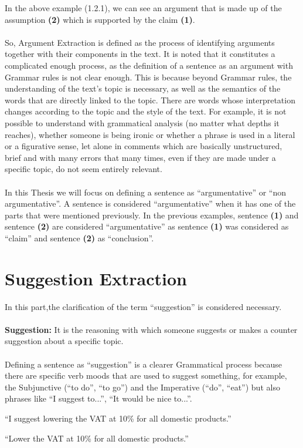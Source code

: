 In the above example (1.2.1), we can see an argument that is made up of the assumption \textbf{(2)} which is supported by the claim \textbf{(1)}.\\
\\
So, Argument Extraction is defined as the process of identifying arguments together with their components in the text. It is noted that it constitutes a complicated enough process, as the definition of a sentence as an argument with Grammar rules is not clear enough. This is because beyond Grammar rules, the understanding of the text's topic is necessary, as well as the semantics of the words that are directly linked to the topic. There are words whose interpretation changes according to the topic and the style of the text. For example, it is not possible to understand with grammatical analysis (no matter what depths it reaches), whether someone is being ironic or whether a phrase is used in a literal or a figurative sense, let alone in comments which are basically unstructured, brief and with many errors that many times, even if they are made under a specific topic, do not seem entirely relevant.\\
\\
In this Thesis we will focus on defining a sentence as ``argumentative'' or ``non argumentative''. A sentence is considered ``argumentative'' when it has one of the parts that were mentioned previously. In the previous examples, sentence \textbf{(1)} and sentence \textbf{(2)} are considered ``argumentative'' as sentence \textbf{(1)} was considered as ``claim'' and sentence \textbf{(2)} as ``conclusion''.

\section{Suggestion Extraction}
In this part,the clarification of the term ``suggestion'' is considered necessary.\\
\\
\textbf{Suggestion:} It is the reasoning with which someone suggests or makes a counter suggestion about a specific topic.\\
\\
Defining a sentence as ``suggestion'' is a clearer Grammatical process because there are specific verb moods that are used to suggest something, for example, the Subjunctive (``to do'', ``to go'') and the  Imperative (``do'', ``eat'') but also phrases like ``I suggest  to...'', ``It would be nice to...''.\\
\begin{example}
	``I suggest lowering the VAT at 10\% for all domestic products.''\\
\end{example}
\begin{example}
	``Lower the VAT at 10\% for all domestic products.''\\
\end{example}

